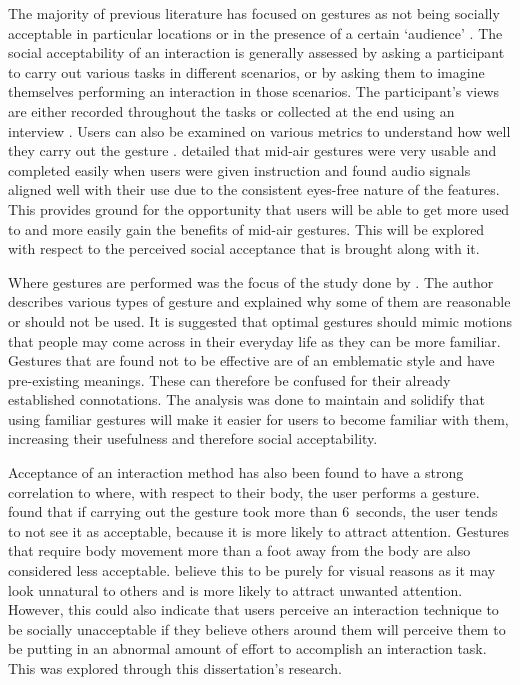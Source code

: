 \documentclass{l4proj}
\begin{document}
The majority of previous literature has focused on gestures as not being socially acceptable in particular locations or in the presence of a certain `audience' \citep{rico_usable_2010, freeman_rhythmic_2017}. The social acceptability of an interaction is generally assessed by asking a participant to carry out various tasks in different scenarios, or by asking them to imagine themselves performing an interaction in those scenarios. The participant's views are either recorded throughout the tasks \citep{ahlstrom_are_2014} or collected at the end using an interview \citep{rico_usable_2010}. Users can also be examined on various metrics to understand how well they carry out the gesture \citep{freeman_rhythmic_2017}. \citet{freeman_rhythmic_2017} detailed that mid-air gestures were very usable and completed easily when users were given instruction and found audio signals aligned well with their use due to the consistent eyes-free nature of the features. This provides ground for the opportunity that users will be able to get more used to and more easily gain the benefits of mid-air gestures. This will be explored with respect to the perceived social acceptance that is brought along with it.

Where gestures are performed was the focus of the study done by \citet{rico_usable_2010}. The author describes various types of gesture and explained why some of them are reasonable or should not be used. It is suggested that optimal gestures should mimic motions that people may come across in their everyday life as they can be more familiar. Gestures that are found not to be effective are of an emblematic style and have pre-existing meanings. These can therefore be confused for their already established connotations. The analysis was done to maintain and solidify that using familiar gestures will make it easier for users to become familiar with them, increasing their usefulness and therefore social acceptability.

Acceptance of an interaction method has also been found to have a strong correlation to where, with respect to their body, the user performs a gesture. \citet{ahlstrom_are_2014} found that if carrying out the gesture took more than 6~seconds, the user tends to not see it as acceptable, because it is more likely to attract attention. Gestures that require body movement more than a foot away from the body are also considered less acceptable. \citet{ahlstrom_are_2014} believe this to be purely for visual reasons as it may look unnatural to others and is more likely to attract unwanted attention. However, this could also indicate that users perceive an interaction technique to be socially unacceptable if they believe others around them will perceive them to be putting in an abnormal amount of effort to accomplish an interaction task. This was explored through this dissertation's research.
\end{document}
